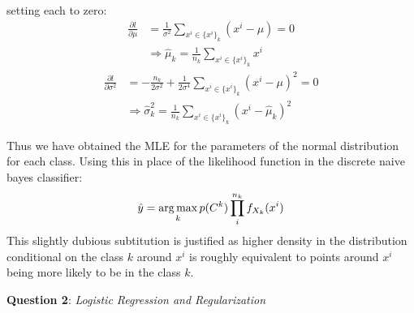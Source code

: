 \documentclass{article} %
\newcommand{\question}[2][]{
  \begin{flushleft}
    \textbf{Question #1}: \textit{#2}

\end{flushleft}}
\DeclareMathOperator*{\argmax}{arg\,max}
\begin{document}
\begin{enumerate}
\begin{itemize}
        setting each to zero:
        \begin{align*}
          \frac{\partial l}{\partial \mu} &=
          \frac{1}{\sigma^2}\sum_{x^i \in \{x^i\}_k}
          (x^i - \mu) = 0 \\
          &\Rightarrow \hat{\mu}_k = \frac{1}{n_k}\sum_{x^i \in \{x^i\}_k} x^i
        \end{align*}
        \begin{align*}
          \frac{\partial l}{\partial \sigma^2} &= -\frac{n_k}{2\sigma^2} +
          \frac{1}{2\sigma^4}\sum_{x^i \in \{x^i\}_k} (x^i - \mu)^2 = 0 \\
          &\Rightarrow \hat{\sigma}^2_k = \frac{1}{n_k}\sum_{x^i \in
          \{x^i\}_k} (x^i - \hat{\mu}_k)^2
        \end{align*}
    \end{itemize}
    Thus we have obtained the MLE for the parameters of the normal
    distribution for each class. Using this in place of the
    likelihood function in the discrete naive bayes classifier:
    \[
      \hat y = \argmax_{k} p(C^k)\prod_i^{n_k} f_{X_k}(x^i)\\
    \]
    This slightly dubious subtitution is justified as higher density
    in the distribution conditional on the class $k$ around $x^i$ is
    roughly equivalent to points around $x^i$ being more likely to be
    in the class $k$.
\end{enumerate}
\question[2]{Logistic Regression and Regularization}
\end{document}
